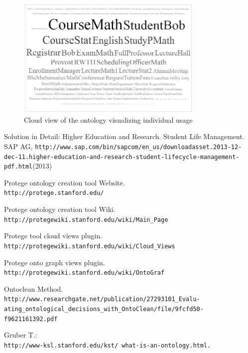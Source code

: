 \documentclass{article}    %
\begin{document}
\begin{figure}[htbp]
  \centering
    \includegraphics[width=0.8\textwidth]{Materials/Figures/cloudIndies.png}
    \caption{Cloud view of the ontology visualizing individual usage}
  \label{cloudIndi}
\end{figure}
%
%
\newpage
\begin{thebibliography}{99}
%
Solution in Detail: Higher Education and Research. Student Life Management.
SAP AG, \texttt{http://www.sap.com/bin/sapcom/en\_us/downloadasset.2013-12-dec-11.higher-education-and-research-student-lifecycle-\newline management-pdf.html}(2013)

Protege ontology creation tool Website.\\
\texttt{http://protege.stanford.edu/}

Protege ontology creation tool Wiki.\\
\texttt{http://protegewiki.stanford.edu/wiki/Main\_Page}

Protege tool cloud views plugin.\\
\texttt{http://protegewiki.stanford.edu/wiki/Cloud\_Views}

Protege onto graph views plugin.\\
\texttt{http://protegewiki.stanford.edu/wiki/OntoGraf}

Ontoclean Method.\\
\texttt{http://www.researchgate.net/publication/27293101\_Evalu-\newline
ating\_ontological\_decisions\_with\_OntoClean/file/9fcfd50-\newline
f9621161392.pdf}

Gruber T.:
\\
\texttt{http://www-ksl.stanford.edu/kst/ what-is-an-ontology.html.} 



\end{thebibliography}
\end{document}

